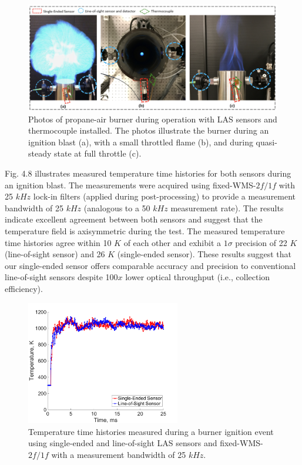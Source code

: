  \begin{figure}[b]
    \centering
        \includegraphics[width=1\textwidth]{fig/ch4_fig6_v3.png}
        \caption{Photos of propane-air burner during operation with LAS sensors and thermocouple installed. The photos illustrate the burner during an ignition blast (a), with a small throttled flame (b), and during quasi-steady state at full throttle (c).}
    \label{fig:ch4_7}
\end{figure}

Fig. 4.8 illustrates measured temperature time histories for both sensors during an ignition blast. The measurements were acquired using fixed-WMS-$2f/1f$ with 25 $kHz$ lock-in filters (applied during post-processing) to provide a measurement bandwidth of 25 $kHz$ (analogous to a 50 $kHz$ measurement rate). The results indicate excellent agreement between both sensors and suggest that the temperature field is axisymmetric during the test. The measured temperature time histories agree within 10 $K$ of each other and exhibit a $1\sigma$ precision of 22 $K$ (line-of-sight sensor) and 26 $K$ (single-ended sensor). These results suggest that our single-ended sensor offers comparable accuracy and precision to conventional line-of-sight sensors despite 100$x$ lower optical throughput (i.e., collection efficiency).

\begin{figure}[b]
    \centering
        \includegraphics[width=0.6\textwidth]{fig/ch4_fig7.png}
        \caption{Temperature time histories measured during a burner ignition event using single-ended and line-of-sight LAS sensors and fixed-WMS-$2f/1f$ with a measurement bandwidth of 25 $kHz$.}
    \label{fig:ch4_8}
\end{figure}

